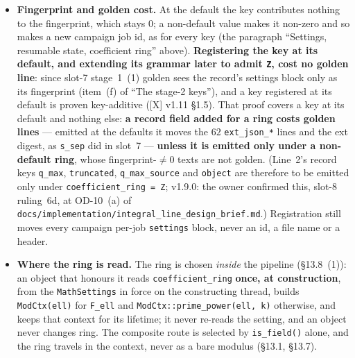 \documentclass[11pt]{article}
\theoremstyle{remark}
\begin{document}
\begin{itemize}
  text) and an undeclared key stay exit~$1$. Until that commit, exit~$1$ as above. The same commit
  makes a \texttt{set}-statement refusal carry the statement's \texttt{file:line:col} (the
  second authorised \texttt{Console/Core/} edit of that decision, [P] v3.7).
  \emph{v1.10.0-pre.2, as built} (slot-9 WP-12, \texttt{b3cd0d3}): exactly so. The CLI maps a
  \texttt{--set} refusal of kind \texttt{NotImplementedInThisBuild} to exit~$5$, and an invalid
  value or an undeclared key to exit~$1$ (\texttt{Core/ConsoleCli}); \texttt{Evaluator::exec\_set}
  back-fills the statement's position into the refusal (\texttt{set coefficient\_ring = "Z"} now
  prints \texttt{file:1:1: not implemented in this build: \ldots}). Arm~(K) of
  \texttt{ConsoleErrorValidation} changed its pin $1\to5$ in the same commit and pins the three
  codes $5$ / $1$ / $0$ and the position. These are the only two \texttt{Console/Core/} edits of
  slot~9.
\item \textbf{Fingerprint and golden cost.} At the default the key contributes nothing to the
  fingerprint, which stays $0$; a non-default value makes it non-zero and so makes a new campaign
  job id, as for every key (the paragraph ``Settings, resumable state, coefficient ring'' above).
  \textbf{Registering the key at its default, and extending its grammar later to admit
  \texttt{Z}, cost no golden line}: since slot-7 stage~1~(1) golden sees the record's settings
  block only as its fingerprint (item~(f) of ``The stage-2 keys''), and a key registered at its
  default is proven key-additive ([X] v1.11 \S1.5). That proof covers a key at its default and
  nothing else: \textbf{a record field added for a ring costs golden lines} --- emitted at the
  defaults it moves the $62$ \texttt{ext\_json\_*} lines and the ext digest, as \texttt{s\_sep}
  did in slot~7 --- \textbf{unless it is emitted only under a non-default ring}, whose
  fingerprint-$\ne0$ texts are not golden. (Line~2's record keys \texttt{q\_max},
  \texttt{truncated}, \texttt{q\_max\_source} and \texttt{object} are therefore to be emitted only
  under \texttt{coefficient\_ring = Z}; v1.9.0: the owner confirmed this, slot-8 ruling~6d, at
  OD-10~(a) of \texttt{docs/implementation/integral\_line\_design\_brief.md}.) Registration still moves every campaign per-job
  \texttt{settings} block, never an id, a file name or a header.
\item \textbf{Where the ring is read.} The ring is chosen \emph{inside} the pipeline (\S13.8~(1)):
  an object that honours it reads \texttt{coefficient\_ring} \textbf{once, at construction}, from
  the \texttt{MathSettings} in force on the constructing thread, builds \texttt{ModCtx(ell)} for
  \texttt{F\_ell} and \texttt{ModCtx::prime\_power(ell, k)} otherwise, and keeps that context for
  its lifetime; it never re-reads the setting, and an object never changes ring. The composite
  route is selected by \texttt{is\_field()} alone, and the ring travels in the context, never as a
  bare modulus (\S13.1, \S13.7).
\end{itemize}
\end{document}
